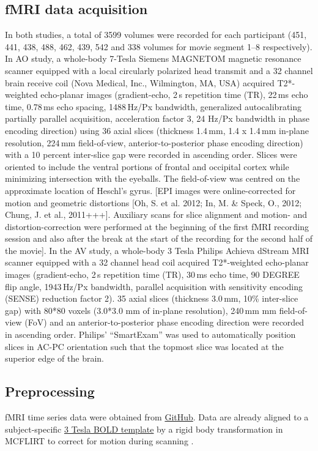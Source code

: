 \documentclass[english]{article}
\begin{document}
\subsection{fMRI data acquisition}
In both studies, a total of 3599 volumes were recorded for each participant (451, 441, 438, 488, 462, 439, 542 and 338 volumes for movie segment 1–8 respectively).
In AO study, a whole-body 7-Tesla Siemens MAGNETOM magnetic resonance scanner equipped with a local circularly polarized head transmit and a 32 channel brain receive coil (Nova Medical, Inc., Wilmington, MA, USA) acquired T2*-weighted echo-planar images (gradient-echo, 2\,s repetition time (TR), 22\,ms echo time, 0.78\,ms echo spacing, 1488\,Hz/Px bandwidth, generalized autocalibrating partially parallel acquisition, acceleration factor 3, 24 Hz/Px bandwidth in phase encoding direction) using 36 axial slices (thickness 1.4\,mm, 1.4 x 1.4\,mm in-plane resolution, 224\,mm field-of-view, anterior-to-posterior phase encoding direction) with a 10 percent inter-slice gap were recorded in ascending order.
Slices were oriented to include the ventral portions of frontal and occipital cortex while minimizing intersection with the eyeballs. The field-of-view was centred on the approximate location of Heschl's gyrus.
[EPI images were online-corrected for motion and geometric distortions [Oh, S. et al. 2012; In, M. \& Speck, O., 2012; Chung, J. et al., 2011+++]. Auxiliary scans for slice alignment and motion- and distortion-correction were performed at the beginning of the first fMRI recording session and also after the break at the start of the recording for the second half of the movie].
In the AV study, a whole-body 3 Tesla Philips Achieva dStream MRI scanner equipped with a 32 channel head coil acquired T2*-weighted echo-planar images (gradient-echo, 2\,s repetition time (TR), 30\,ms echo time, 90 DEGREE flip angle, 1943\,Hz/Px bandwidth, parallel acquisition with sensitivity encoding (SENSE) reduction factor 2).
35 axial slices (thickness 3.0\,mm, 10\% inter-slice gap) with 80*80 voxels (3.0*3.0 mm of in-plane resolution), 240\,mm mm field-of-view (FoV) and an anterior-to-posterior phase encoding direction were recorded in ascending order.
Philips' ``SmartExam'' was used to automatically position slices in AC-PC orientation such that the topmost slice was located at the superior edge of the brain.


\subsection{Preprocessing}
fMRI time series data were obtained from
\href{''https://github.com/psychoinformatics-de/studyforrest-data-aligned''}{GitHub}. Data are already aligned to a subject-specific \href{''https://github.com/psychoinformatics-de/studyforrest-data-templatetransforms''}{3 Tesla BOLD template} by a rigid body transformation in MCFLIRT \citep{jenkinson2002registration} to correct for motion during scanning
\citep{sengupta2016extension}.
\end{document}

